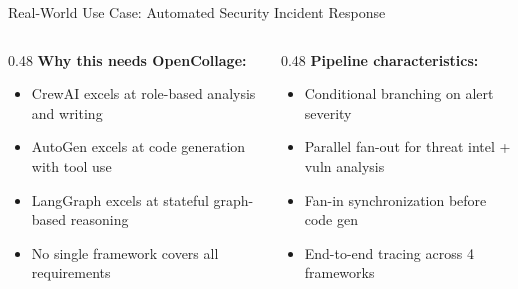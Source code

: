 \begin{frame}{\fontsize{10}{12}\selectfont Real-World Use Case: Automated Security Incident Response}
\begin{center}
  \end{center}

  \vspace{0.0cm}

  \fontsize{6}{7}\selectfont
  \begin{columns}[T]
    \begin{column}{0.48\textwidth}
      \textbf{Why this needs OpenCollage:}
      \begin{itemize}
        \item CrewAI excels at role-based analysis and writing
        \item AutoGen excels at code generation with tool use
        \item LangGraph excels at stateful graph-based reasoning
        \item No single framework covers all requirements
      \end{itemize}
    \end{column}
    \begin{column}{0.48\textwidth}
      \textbf{Pipeline characteristics:}
      \begin{itemize}
        \item Conditional branching on alert severity
        \item Parallel fan-out for threat intel + vuln analysis
        \item Fan-in synchronization before code gen
        \item End-to-end tracing across 4 frameworks
      \end{itemize}
    \end{column}
  \end{columns}
\end{frame}
